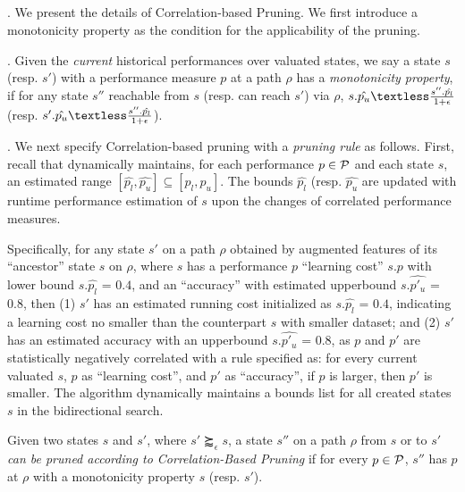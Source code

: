 \subsection{\bimodis}

. 
We present the details of Correlation-based Pruning. 
We first introduce a monotonicity property as the 
condition for the applicability of the pruning. 

. 
Given the {\em current} 
historical performances over valuated
states, we say a state $s$ (resp. $s'$) with  
a performance measure $p$ at a path $\rho$ 
has a {\em monotonicity property}, if for 
any state $s''$ reachable from $s$ (resp. can reach $s'$) via $\rho$, 
$s.\hat{p_u}\textless \frac{s''.\hat{p_l}}{1+\epsilon}$ (resp. $s'.\hat{p_u}\textless \frac{s''.\hat{p_l}}{1+\epsilon}$). 


. 
We next specify Correlation-based pruning with 
a {\em pruning rule} as follows. 
First, recall that \bimodis dynamically maintains, 
for each performance $p\in \P$ and each 
state $s$, an estimated range 
$[\hat{p_l}, \hat{p_u}]\subseteq [p_l, p_u]$. 
The bounds $\hat{p_l}$ (resp. $\hat{p_u}$ 
are updated with runtime performance estimation 
of $s$ upon the changes of correlated 
performance measures. 

Specifically, for any  
state $s'$ on a path $\rho$  
obtained by augmented features 
of its ``ancestor'' state $s$ on $\rho$, 
where $s$ has a performance $p$ ``learning cost'' 
$s.p$ with lower bound $s.\hat{p_l}$ = $0.4$, 
and an ``accuracy'' with estimated 
upperbound $s.\hat{p'_u}$ = $0.8$, 
then (1) $s'$ has an estimated running cost 
initialized as $s.\hat{p_l}$ = $0.4$, indicating 
a learning cost no smaller than the counterpart $s$ 
with smaller dataset; 
and (2) $s'$ has an estimated accuracy 
with an upperbound $s.\hat{p'_u}$ = $0.8$, 
as $p$ and $p'$ are statistically 
negatively correlated with a rule specified 
as: for every current valuated $s$,  
$p$ as ``learning cost'', and $p'$ as ``accuracy'', 
if $p$ is larger, then $p'$ is smaller. 
The algorithm \bimodis dynamically 
maintains a bounds list for 
all created states $s$ in the 
bidirectional search. 

Given two states $s$ and $s'$, 
where $s' \succapprox_{\epsilon} s$, 
a state $s''$ on a path $\rho$ from $s$ or to $s'$ 
{\em can be pruned according to Correlation-Based Pruning} if 
for every $p\in \P$, $s''$ has $p$ 
at $\rho$ with a monotonicity property 
\wrt $s$ (resp. $s'$). 

